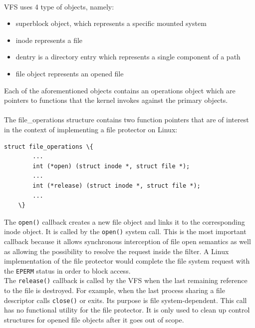 	\paragraph{}
	VFS uses 4 type of objects, namely:
	
	\begin{itemize}
		\item superblock object, which represents a specific mounted system
		\item inode represents a file 
		\item dentry is a directory entry which represents a single component of a path
		\item file object represents an opened file
	\end{itemize}
	
	Each of the aforementioned objects contains an operations object which are pointers to functions that the kernel invokes against the primary objects.
	
	\paragraph{}
	The file\_operations structure contains two function pointers that are of interest in the context of implementing a file protector on Linux: \\
	
	\begin{Verbatim}[fontsize=\small, commandchars=\\\{\}]
	struct file_operations \{ 
		...
		int (*open) (struct inode *, struct file *); 
		...
		int (*release) (struct inode *, struct file *); 
		...
	\}	
	\end{Verbatim}
	
	The \texttt{open()} callback creates a new file object and links it to the corresponding inode object. It is called by the \texttt{open()} system call\cite{LinuxKernelDevelopment}. This is the most important callback because it allows synchronous interception of file open semantics as well as allowing the possibility to resolve the request inside the filter. A Linux implementation of the file protector would complete the file system request with the \texttt{EPERM} status in order to block access.\\ 
	
	The \texttt{release()} callback is called by the VFS when the last remaining reference to the file is destroyed. For example, when the last process sharing a file descriptor calls \texttt{close()} or exits. Its purpose is file system-dependent\cite{LinuxKernelDevelopment}. This call has no functional utility for the file protector. It is only used to clean up control structures for opened file objects after it goes out of scope. 
	
